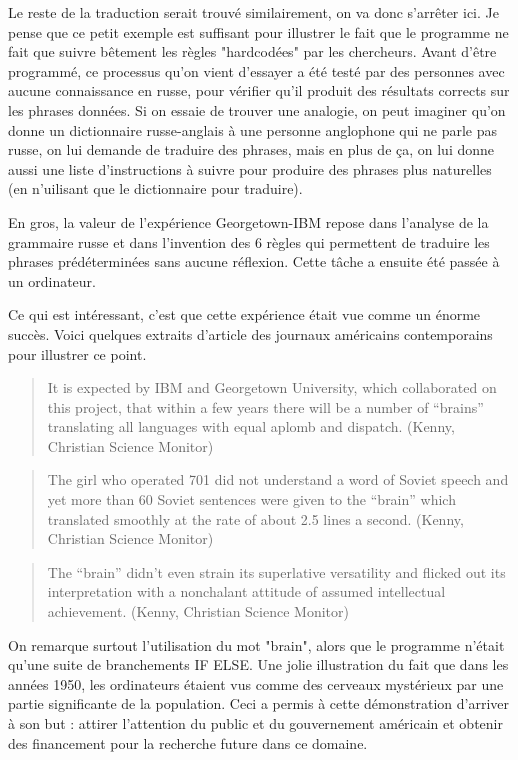 \documentclass[11pt, a4paper]{report}
\begin{document}
Le reste de la traduction serait trouvé similairement, on va donc s'arrêter ici. Je pense que ce 
petit exemple est suffisant pour illustrer le fait que le programme ne fait que suivre bêtement les 
règles "hardcodées" par les chercheurs. Avant d'être programmé, ce processus qu'on vient d'essayer 
a été testé par des personnes avec aucune connaissance en russe, pour vérifier qu'il produit des 
résultats corrects sur les phrases données. Si on essaie de trouver une analogie, on peut imaginer
qu'on donne un dictionnaire russe-anglais à une personne anglophone qui ne parle pas russe, on lui demande 
de traduire des phrases, mais en plus de ça, on lui donne aussi une liste d'instructions à suivre 
pour produire des phrases plus naturelles (en n'uilisant que le dictionnaire pour traduire). 

En gros, la valeur de l'expérience Georgetown-IBM repose dans l'analyse de la grammaire russe et dans 
l'invention des 6 règles qui permettent de traduire les phrases prédéterminées sans aucune réflexion. 
Cette tâche a ensuite été passée à un ordinateur. 

Ce qui est intéressant, c'est que cette expérience était vue comme un énorme succès. Voici quelques 
extraits d'article des journaux américains contemporains pour illustrer ce point.
\begin{quote} 
It is expected by IBM and Georgetown University, which collaborated on this project,
that within a few years there will be a number of “brains” translating all languages
with equal aplomb and dispatch. (Kenny, Christian Science Monitor)
\end{quote}

\begin{quote}
The girl who operated 701 did not understand a word of Soviet speech and yet more
than 60 Soviet sentences were given to the “brain” which translated smoothly at the
rate of about 2.5 lines a second. (Kenny, Christian Science Monitor)
\end{quote}

\begin{quote}
The “brain” didn’t even strain its superlative versatility and flicked out its
interpretation with a nonchalant attitude of assumed intellectual achievement. (Kenny,
Christian Science Monitor)
\end{quote}

On remarque surtout l'utilisation du mot "brain", alors que le programme n'était qu'une suite 
de branchements IF ELSE. Une jolie illustration du fait que dans les années 1950, les ordinateurs 
étaient vus comme des cerveaux mystérieux par une partie significante de la population. 
Ceci a permis à cette démonstration d'arriver à son but : attirer l'attention du public et du 
gouvernement américain et obtenir des financement pour 
la recherche future dans ce domaine. 
  
\end{document}
